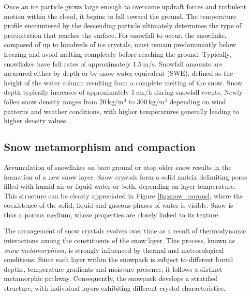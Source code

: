 Once an ice particle grows large enough to overcome updraft forces and turbulent motion within the cloud, it begins to fall toward the ground. The 
temperature profile encountered by the descending particle ultimately determines the type of precipitation that reaches the surface. For 
snowfall to occur, the snowflake, composed of up to hundreds of ice crystals, must remain predominantly below freezing and avoid melting completely
before reaching the ground. Typically, snowflakes have fall rates of approximately $\SI{1.5}{\meter\per\second}$. Snowfall amounts are measured either 
by depth or by snow water equivalent (SWE), defined as the height of the water column resulting from a complete melting of the snow. Snow depth typically 
increases of approximately $\SI{1}{\centi\meter\per\hour}$ during snowfall events. Newly fallen snow density ranges from $\SI{20}{\kilo\gram\per\meter\cubed}$ 
to $\SI{300}{\kilo\gram\per\meter\cubed}$ depending on wind patterns and weather conditions, with higher temperatures generally leading to higher 
density values \parencite{libro_SNOW}.



\subsection{Snow metamorphism and compaction}
Accumulation of snowflakes on bare ground or atop older snow results in the formation of a new snow layer. Snow crystals form a solid matrix 
delimiting pores filled with humid air or liquid water or both, depending on layer temperature. This structure can be clearly appreciated in Figure 
\ref{fig:snow_porous}, where the coexistence of the solid, liquid and gaseous phases of water is visible. Snow is thus a porous medium, whose 
properties are closely linked to its texture.

The arrangement of snow crystals evolves over time as a result of thermodynamic interactions among the constituents of the snow layer. This process, 
known as \textit{snow metamorphism}, is strongly influenced by thermal and meteorological conditions. Since each layer within the snowpack is subject 
to different burial depths, temperature gradients and moisture presence, it follows a distinct metamorphic pathway. Consequently, the snowpack develops 
a stratified structure, with individual layers exhibiting different crystal characteristics.

